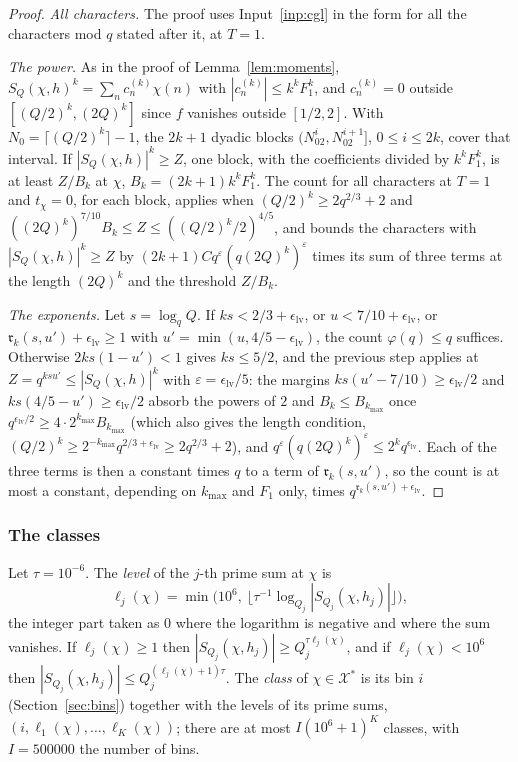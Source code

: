 \documentclass[11pt]{article}
\theoremstyle{definition}
\begin{document}
\begin{proof}
\emph{All characters.} The proof uses Input~\ref{inp:cgl} in the form for all the characters mod $q$ stated after it,
at $T = 1$.

\emph{The power.} As in the proof of Lemma~\ref{lem:moments}, $S_Q(\chi, h)^k = \sum_n c^{(k)}_n \chi(n)$ with
$|c^{(k)}_n| \le k^k F_1^k$, and $c^{(k)}_n = 0$ outside $[(Q/2)^k, (2Q)^k]$ since $f$ vanishes outside $[1/2, 2]$.
With $N_0 = \lceil (Q/2)^k \rceil - 1$, the $2k + 1$ dyadic blocks $(N_02^i, N_02^{i+1}]$, $0 \le i \le 2k$, cover that
interval. If $|S_Q(\chi, h)|^k \ge Z$, one block, with the coefficients divided by $k^k F_1^k$, is at least $Z/B_k$ at
$\chi$, $B_k = (2k + 1) k^k F_1^k$. The count for all characters at $T = 1$ and $t_\chi = 0$, for each block,
applies when $(Q/2)^k \ge 2q^{2/3} + 2$ and $((2Q)^k)^{7/10} B_k \le Z \le ((Q/2)^k/2)^{4/5}$, and bounds the
characters with $|S_Q(\chi, h)|^k \ge Z$ by $(2k + 1) C q^\varepsilon (q(2Q)^k)^\varepsilon$ times its sum of three
terms at the length $(2Q)^k$ and the threshold $Z/B_k$.

\emph{The exponents.} Let $s = \log_q Q$. If $ks < 2/3 + \epsilon_{\mathrm{lv}}$, or $u < 7/10 +
\epsilon_{\mathrm{lv}}$, or $\mathfrak r_k(s, u') + \epsilon_{\mathrm{lv}} \ge 1$ with $u' = \min(u, 4/5 -
\epsilon_{\mathrm{lv}})$, the count $\varphi(q) \le q$ suffices. Otherwise $2ks(1 - u') < 1$ gives $ks \le 5/2$, and
the previous step applies at $Z = q^{ksu'} \le |S_Q(\chi, h)|^k$ with $\varepsilon = \epsilon_{\mathrm{lv}}/5$: the
margins $ks(u' - 7/10) \ge \epsilon_{\mathrm{lv}}/2$ and $ks(4/5 - u') \ge \epsilon_{\mathrm{lv}}/2$ absorb the powers
of $2$ and $B_k \le B_{k_{\max}}$ once $q^{\epsilon_{\mathrm{lv}}/2} \ge 4 \cdot 2^{k_{\max}} B_{k_{\max}}$ (which
also gives the length condition, $(Q/2)^k \ge 2^{-k_{\max}} q^{2/3 + \epsilon_{\mathrm{lv}}} \ge 2q^{2/3} + 2$), and
$q^\varepsilon (q(2Q)^k)^\varepsilon \le 2^k q^{\epsilon_{\mathrm{lv}}}$. Each of the three terms is
then a constant times $q$ to a term of $\mathfrak r_k(s, u')$, so the count is at most a constant, depending on
$k_{\max}$ and $F_1$ only, times $q^{\mathfrak r_k(s, u') + \epsilon_{\mathrm{lv}}}$.
\end{proof}

\subsubsection*{The classes}

Let $\tau = 10^{-6}$. The \emph{level} of the $j$-th prime sum at $\chi$ is
\[
  \ell_j(\chi) = \min\bigl(10^6,\ \lfloor \tau^{-1} \log_{Q_j} |S_{Q_j}(\chi, h_j)| \rfloor\bigr),
\]
the integer part taken as $0$ where the logarithm is negative and where the sum vanishes. If $\ell_j(\chi) \ge 1$ then
$|S_{Q_j}(\chi, h_j)| \ge Q_j^{\tau\ell_j(\chi)}$, and if $\ell_j(\chi) < 10^6$ then $|S_{Q_j}(\chi, h_j)| \le
Q_j^{(\ell_j(\chi) + 1)\tau}$. The \emph{class} of $\chi \in \mathcal X^*$ is its bin $i$ (Section~\ref{sec:bins})
together with the levels of its prime sums, $(i, \ell_1(\chi), \dots, \ell_K(\chi))$; there are at most $I (10^6 +
1)^K$ classes, with $I = 500000$ the number of bins.
\end{document}
